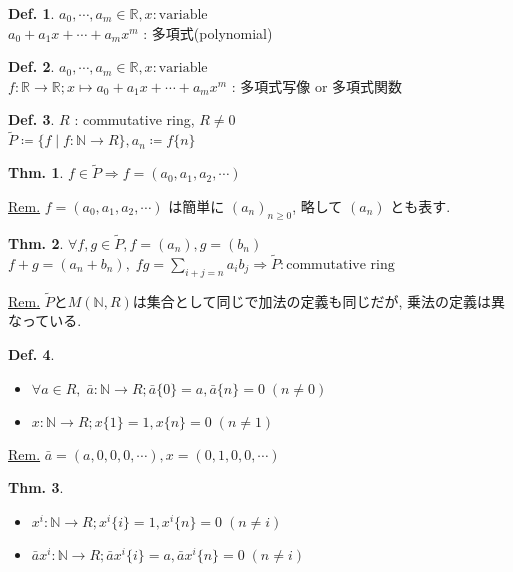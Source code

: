 \documentclass[uplatex,dvipdfmx,9pt]{beamer}
\newcommand{\R}{\mathbb{R}}
\newcommand{\N}{\mathbb{N}}
\theoremstyle{definition} %
\newtheorem{defn}{Def.}[subsection] %
\newtheorem{thm}{Thm.}[subsection] %
\theoremstyle{example}
\begin{document}
\begin{frame}

  \begin{defn}
    $a_0, \cdots, a_m \in \R, x : \text{variable}$ \\
    $a_0 + a_1 x + \cdots + a_m x^m$ : 多項式(polynomial)
  \end{defn}

  \begin{defn}
    $a_0, \cdots, a_m \in \R, x : \text{variable}$ \\
    $f\colon \R \to \R; x \mapsto a_0 + a_1 x + \cdots + a_m x^m$ : \alert{多項式写像} or \alert{多項式関数}
  \end{defn}

  \begin{defn}
    $R$ : commutative ring, $R \neq 0$ \\
    $\tilde{P} \coloneqq \{f \mid f\colon \N \to R\}, a_n \coloneqq f\{n\}$
  \end{defn}

  \begin{thm}
    $f \in \tilde{P} \Rightarrow f = (a_0, a_1, a_2, \cdots)$
  \end{thm}
  \underline{Rem.} $f = (a_0, a_1, a_2, \cdots)$ は簡単に $(a_n)_{n \ge 0}$, 略して $(a_n)$ とも表す.

\end{frame}

\begin{frame}

  \begin{thm}
    $\forall f, g \in \tilde{P}, f = (a_n), g = (b_n)$ \\
    $f + g = (a_n + b_n), \; fg = \displaystyle\sum_{i + j = n} a_i b_j \Rightarrow \tilde{P} : \text{commutative ring}$
  \end{thm}
  \underline{Rem.} $\tilde{P}$と$M(\N, R)$は集合として同じで加法の定義も同じだが, 乗法の定義は異なっている.

  \begin{defn}
    \begin{itemize}
      \item $\forall a \in R, \; \bar{a}\colon \N \to R; \bar{a}\{0\} = a, \bar{a}\{n\} = 0 \; (n \neq 0)$
      \item $x\colon \N \to R; x\{1\} = 1, x\{n\} = 0 \; (n \neq 1)$
    \end{itemize}
  \end{defn}
  \underline{Rem.} $\bar{a} = (a, 0, 0, 0, \cdots), x = (0, 1, 0, 0, \cdots)$

  \begin{thm}
    \begin{itemize}
      \item $x^i\colon \N \to R; x^i\{i\} = 1, x^i\{n\} = 0 \; (n \neq i)$
      \item $\bar{a}x^i\colon \N \to R; \bar{a}x^i\{i\} = a, \bar{a}x^i\{n\} = 0 \; (n \neq i)$
    \end{itemize}
  \end{thm}

\end{frame}
\end{document}
